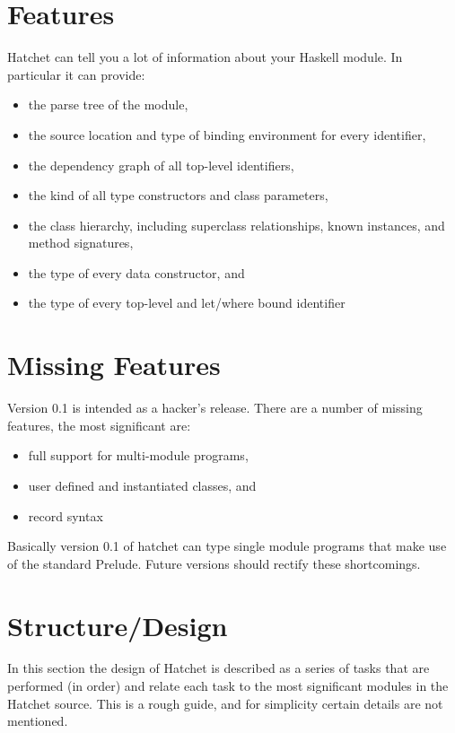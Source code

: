 \documentclass{article}
\begin{document}
\section{Features}

Hatchet can tell you a lot of information about your Haskell module.
In particular it can provide:

\begin{itemize}
\item the parse tree of the module, 
\item the source location and type of binding environment
      for every identifier,
\item the dependency graph of all top-level identifiers,
\item the kind of all type constructors and class parameters,
\item the class hierarchy, including superclass relationships,
      known instances, and method signatures,
\item the type of every data constructor, and
\item the type of every top-level and let/where bound identifier
\end{itemize}

\section{Missing Features}

Version 0.1 is intended as a hacker's release. There are a number of
missing features, the most significant are:

\begin{itemize}
\item full support for multi-module programs,
\item user defined and instantiated classes, and
\item record syntax 
\end{itemize}

Basically version 0.1 of hatchet can type single module 
programs that make use of the standard Prelude. Future versions
should rectify these shortcomings.

\section{Structure/Design}

In this section the design of Hatchet is described as a series 
of tasks that are performed (in order) and relate each task to
the most significant modules in the Hatchet source. This is
a rough guide, and for simplicity certain details are
not mentioned.
\end{document}
